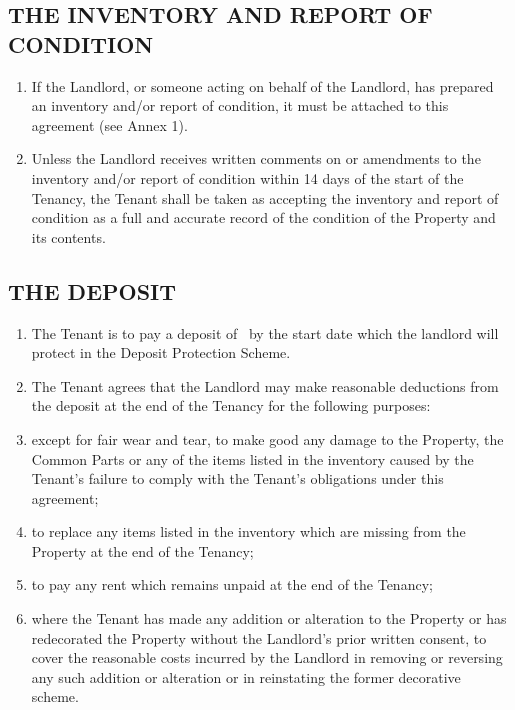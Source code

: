 \subsection{THE INVENTORY AND REPORT OF CONDITION}

\begin{enumerate}
\item{If the Landlord, or someone acting on behalf of the Landlord, has prepared an inventory and/or report of condition, it must be attached to this agreement (see Annex 1).}
\item{Unless the Landlord receives written comments on or amendments to the inventory and/or report of condition within 14 days of the start of the Tenancy, the Tenant shall be taken as accepting the inventory and report of condition as a full and accurate record of the condition of the Property and its contents.}
\end{enumerate}

\subsection{THE DEPOSIT}
\begin{enumerate}

\item{The Tenant is to pay a deposit of \textsterling \Deposit\ by the start date which the landlord will protect in the Deposit Protection Scheme.} 


\item{The Tenant agrees that the Landlord may make reasonable deductions from the deposit at the end of the Tenancy for the following purposes:}

\item except for fair wear and tear, to make good any damage to the
    Property, the Common Parts or any of the items listed in the
    inventory caused by the Tenant's failure to comply with the Tenant's
    obligations under this agreement;

\item to replace any items listed in the inventory which are missing from
    the Property at the end of the Tenancy;

\item to pay any rent which remains unpaid at the end of the Tenancy;

\item where the Tenant has made any addition or alteration to the Property
    or has redecorated the Property without the Landlord's prior written
    consent, to cover the reasonable costs incurred by the Landlord in
    removing or reversing any such addition or alteration or in
    reinstating the former decorative scheme.
\end{enumerate}

